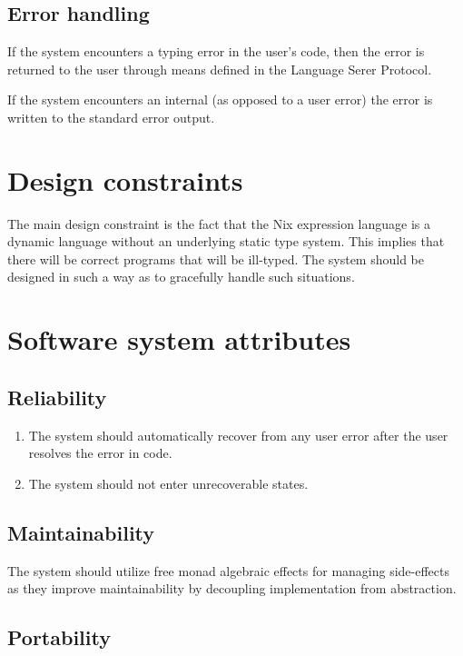 \documentclass[12pt]{article}
\begin{document}
\subsection{Error handling}

If the system encounters a typing error in the user's code, then the error is returned to the user through means defined in the Language Serer Protocol.

If the system encounters an internal (as opposed to a user error) the error is written to the standard error output.

\section{Design constraints}

The main design constraint is the fact that the Nix expression language is a dynamic language without an underlying static type system. This implies that there will be correct programs that will be ill-typed. The system should be designed in such a way as to gracefully handle such situations.

\section{Software system attributes}

\subsection{Reliability}

\begin{enumerate}
  \item The system should automatically recover from any user error after the user resolves the error in code.
  \item The system should not enter unrecoverable states.
\end{enumerate}

\subsection{Maintainability}

The system should utilize free monad algebraic effects for managing side-effects as they improve maintainability by decoupling implementation from abstraction.

\subsection{Portability}
\end{document}
